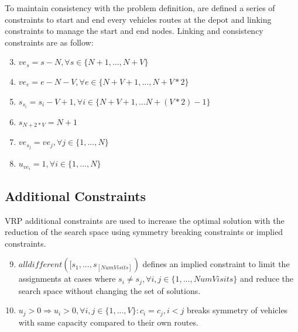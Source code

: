 To maintain consistency with the problem definition, are defined a series of constraints to start and end every vehicles routes at the depot and linking constraints to manage the start and end nodes.\newline
Linking and consistency constraints are as follow:
\begin{enumerate}
 \setcounter{enumi}{2}
    \item \begin{math} ve_{s} = s - N,  \forall s \in \{N+1, ..., N + V\}\end{math}
    \item \begin{math}ve_{e} = e - N - V, \forall e \in \{N + V + 1, ..., N + V * 2\}\end{math}
    \item \begin{math}s_{s_{i}} = s_{i} - V + 1, \forall i \in \{N + V + 1,...N + (V * 2) - 1\} \end{math}
    \item \begin{math}s_{N + 2 * V} = N + 1\end{math}
    \item \begin{math}ve_{s_{j}} = ve_{j}, \forall j \in \{1,..., N\}\end{math}
    \item \begin{math}u_{ve_{i}} = 1, \forall i \in \{1,...,N\}\end{math}
\end{enumerate}
\subsection{Additional Constraints}
VRP additional constraints are used to increase the optimal solution with the reduction of the search space using symmetry breaking constraints or implied constraints.

\begin{enumerate}
 \setcounter{enumi}{8}
    \item \begin{math}alldifferent([s_{1},...,s_[NumVisits])\end{math} defines an implied constraint to limit the assignments at cases where \begin{math}s_{i} \neq s_{j}, \forall i,j \in \{1,...,NumVisits\}\end{math} and reduce the search space without changing the set of solutions.
    \item \begin{math}u_{j} > 0 \Rightarrow u_{i} > 0, \forall i,j \in \{1,...,V\} : c_{i} = c_{j}, i < j\end{math} breaks symmetry of vehicles with same capacity compared to their own routes.
\end{enumerate}
\newpage
